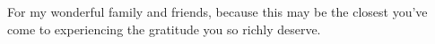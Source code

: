 
\begin{dedication} 

For my wonderful family and friends, because this may be the closest you've come to experiencing the gratitude you so richly deserve.

\end{dedication}

